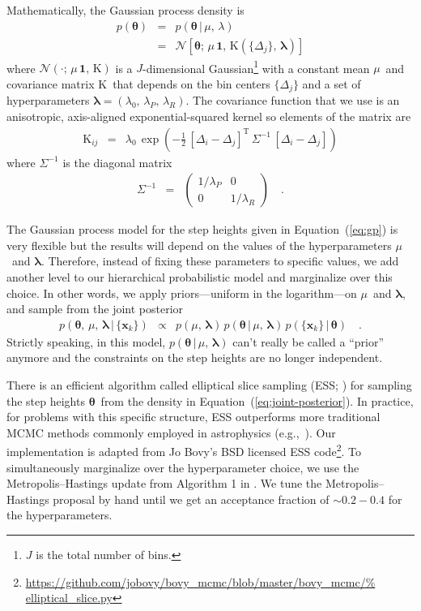 \documentclass[12pt,preprint]{aastex}
\newcommand{\Eq}[1]{Equation~(\ref{eq:#1})}
\newcommand{\eq}[1]{\Eq{#1}}
\newcommand{\eqlabel}[1]{\label{eq:#1}}
\newcommand{\bvec}[1]{\ensuremath{\boldsymbol{#1}}}
\newcommand{\ratepar}{{\ensuremath{\theta}}}
\newcommand{\ratepars}{{\ensuremath{\bvec{\ratepar}}}}
\newcommand{\radius}{\ensuremath{R}}
\newcommand{\period}{\ensuremath{P}}
\newcommand{\data}{{\ensuremath{\bvec{x}}}}
\newcommand{\binarea}{{\ensuremath{\Delta}}}
\newcommand{\mean}{{\ensuremath{\mu}}}
\newcommand{\smooth}{{\ensuremath{\lambda}}}
\newcommand{\smoothpars}{{\ensuremath{\bvec{\smooth}}}}
\newcommand{\cov}{{\ensuremath{\mathrm{K}}}}
\begin{document}
Mathematically, the Gaussian process density is
\begin{eqnarray}
p(\ratepars) &=& p(\ratepars\,|\,\mean,\,\smooth) \nonumber\\
&=& \mathcal{N} \left[\ratepars;\,\mean\,\bvec{1},\,
\cov(\{\binarea_j\},\,\smoothpars)\right]
\eqlabel{gp}
\end{eqnarray}
where $\mathcal{N}(\cdot;\,\mean\,\bvec{1},\,\cov)$ is a $J$-dimensional
Gaussian\footnote{$J$ is the total number of bins.} with a constant mean
\mean\ and covariance matrix \cov\ that depends on the bin centers
$\{\binarea_j\}$ and a set of hyperparameters $\smoothpars = (\smooth_0,\,
\smooth_\period,\,\smooth_\radius)$.
The covariance function that we use is an anisotropic, axis-aligned
exponential-squared kernel so elements of the matrix are
\begin{eqnarray}
\cov_{ij} &=& \smooth_0\,\exp\left(-\frac{1}{2}\,
    [\binarea_i-\binarea_j]^\mathrm{T}\,\Sigma^{-1}\,[\binarea_i-\binarea_j]
\right)
\end{eqnarray}
where $\Sigma^{-1}$ is the diagonal matrix
\begin{eqnarray}
\Sigma^{-1} &=& \left(\begin{array}{cc}
1/\smooth_\period & 0 \\
0 & 1/\smooth_\radius
\end{array}\right) \quad.
\end{eqnarray}

The Gaussian process model for the step heights given in \eq{gp} is very
flexible but the results will depend on the values of the hyperparameters
\mean\ and \smoothpars.
Therefore, instead of fixing these parameters to specific values, we add
another level to our hierarchical probabilistic model and marginalize over
this choice.
In other words, we apply priors---uniform in the logarithm---on \mean\ and
\smoothpars, and sample from the joint posterior
\begin{eqnarray} \eqlabel{joint-posterior}
p(\ratepars,\,\mean,\,\smoothpars\,|\,\{\data_k\}) &\propto&
    p(\mean,\,\smoothpars)\,p(\ratepars\,|\,\mean,\,\smoothpars)\,
    p(\{\data_k\}\,|\,\ratepars) \quad.
\end{eqnarray}
Strictly speaking, in this model, $p(\ratepars\,|\,\mean,\,\smoothpars)$ can't
really be called a ``prior'' anymore and the constraints on the step heights
are no longer independent.

There is an efficient algorithm called elliptical slice sampling (ESS;
\citealt{ess, ess-hyper}) for sampling the step heights \ratepars\ from the
density in \eq{joint-posterior}.
In practice, for problems with this specific structure, ESS outperforms more
traditional MCMC methods commonly employed in astrophysics
(e.g.,~\citealt{emcee}).
Our implementation is adapted from Jo Bovy's BSD licensed ESS
code\footnote{\url{https://github.com/jobovy/bovy_mcmc/blob/master/bovy_mcmc/%
elliptical_slice.py}}.
To simultaneously marginalize over the hyperparameter choice, we use the
Metropolis--Hastings update from Algorithm 1 in \citet{ess-hyper}.
We tune the Metropolis--Hastings proposal by hand until we get an acceptance
fraction of $\sim0.2-0.4$ for the hyperparameters.
\end{document}

